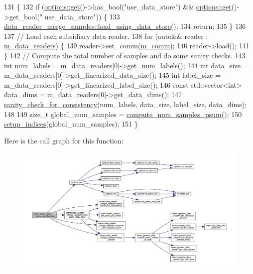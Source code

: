 \begin{DoxyCode}
131                                      \{
132   \textcolor{keywordflow}{if} (\hyperlink{classoptions_a9ecfe9c365269df68a41b961c31ae3f5}{options::get}()->has\_bool(\textcolor{stringliteral}{"use\_data\_store"}) && \hyperlink{classoptions_a9ecfe9c365269df68a41b961c31ae3f5}{options::get}()->get\_bool(\textcolor{stringliteral}{"
      use\_data\_store"})) \{
133     \hyperlink{classlbann_1_1data__reader__merge__samples_ad45275b73fcbca47b74a9c9767f69bc9}{data\_reader\_merge\_samples::load\_using\_data\_store}();
134     \textcolor{keywordflow}{return};
135   \}
136 
137   \textcolor{comment}{// Load each subsidiary data reader.}
138   \textcolor{keywordflow}{for} (\textcolor{keyword}{auto}&& reader : \hyperlink{classlbann_1_1generic__compound__data__reader_a9815e94ade5873415fd766e09d956d5b}{m\_data\_readers}) \{
139     reader->set\_comm(\hyperlink{classlbann_1_1generic__data__reader_ad3976d4b7db2d404dbb87a56c33fd456}{m\_comm});
140     reader->load();
141   \}
142   \textcolor{comment}{// Compute the total number of samples and do some sanity checks.}
143   \textcolor{keywordtype}{int} num\_labels = m\_data\_readers[0]->get\_num\_labels();
144   \textcolor{keywordtype}{int} data\_size = m\_data\_readers[0]->get\_linearized\_data\_size();
145   \textcolor{keywordtype}{int} label\_size = m\_data\_readers[0]->get\_linearized\_label\_size();
146   \textcolor{keyword}{const} std::vector<int> data\_dims = m\_data\_readers[0]->get\_data\_dims();
147   \hyperlink{classlbann_1_1data__reader__merge__samples_a240368aa9f7f2ab1fa7c8d534b7f54ed}{sanity\_check\_for\_consistency}(num\_labels, data\_size, label\_size, data\_dims);
148 
149   \textcolor{keywordtype}{size\_t} global\_num\_samples = \hyperlink{classlbann_1_1data__reader__merge__samples_aafa54258bdc9d888da61c817462cdf65}{compute\_num\_samples\_psum}();
150   \hyperlink{classlbann_1_1data__reader__merge__samples_ae5fe8d5cf8eb1a6aa715579d329a620e}{setup\_indices}(global\_num\_samples);
151 \}
\end{DoxyCode}
Here is the call graph for this function\+:\nopagebreak
\begin{figure}[H]
\begin{center}
\leavevmode
\includegraphics[width=350pt]{classlbann_1_1data__reader__merge__samples_ab3554341417f5eba95b9c1098af40410_cgraph}
\end{center}
\end{figure}
